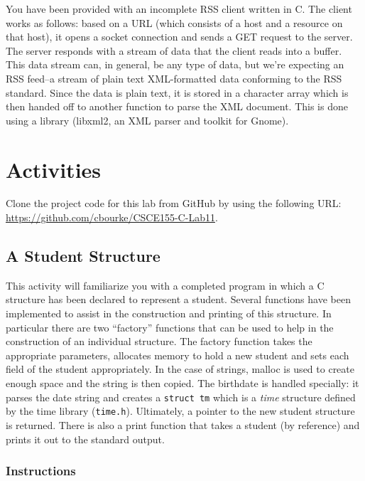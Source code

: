 \documentclass[12pt]{scrartcl}
\begin{document}
You have been provided with an incomplete RSS client written in C.  
The client works as follows: based on a URL (which consists of a 
host and a resource on that host), it opens a socket connection and 
sends a GET request to the server.  The server responds with a 
stream of data that the client reads into a buffer.  This data stream 
can, in general, be any type of data, but we're expecting an RSS 
feed--a stream of plain text XML-formatted data conforming to the 
RSS standard.  Since the data is plain text, it is stored in a 
character array which is then handed off to another function 
to parse the XML document.  This is done using a library (libxml2, 
an XML parser and toolkit for Gnome).

\section{Activities}

Clone the project code for this lab from GitHub by using the following URL:
\url{https://github.com/cbourke/CSCE155-C-Lab11}.

\subsection{A Student Structure}

This activity will familiarize you with a completed program in which 
a C structure has been declared to represent a student.  Several 
functions have been implemented to assist in the construction and 
printing of this structure.  In particular there are two ``factory'' 
functions that can be used to help in the construction of an individual 
structure.  The factory function takes the appropriate parameters, 
allocates memory to hold a new student and sets each field of the 
student appropriately.  In the case of strings, malloc is used to create 
enough space and the string is then copied.  The birthdate is handled 
specially: it parses the date string and creates a \texttt{struct tm} 
which is a \emph{time} structure defined by the time library 
(\texttt{time.h}).  Ultimately, a pointer to the new student 
structure is returned.  There is also a print function that takes a 
student (by reference) and prints it out to the standard output.


\subsubsection*{Instructions}
\end{document}
